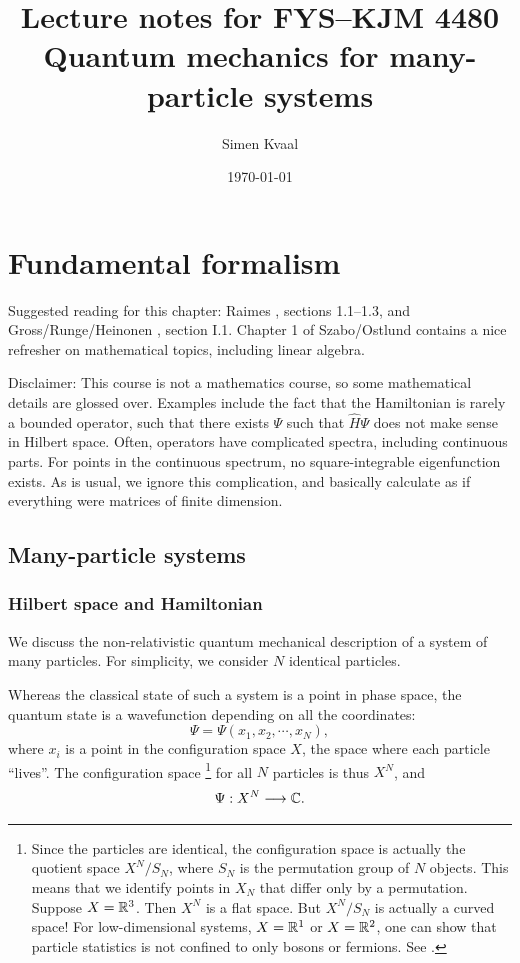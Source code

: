 \documentclass{report}
\title{Lecture notes for FYS--KJM 4480\\\large Quantum mechanics for many-particle systems}
\author{Simen Kvaal}
\date{\today}
\theoremstyle{plain}
\theoremstyle{definition}
\begin{document}
\maketitle

\tableofcontents

\chapter{Fundamental formalism}

Suggested reading for this chapter: Raimes \cite{Raimes}, sections
1.1--1.3, and Gross/Runge/Heinonen \cite{GRH}, section I.1.  Chapter 1
of Szabo/Ostlund \cite{SzaboOstlund} contains a nice refresher on
mathematical topics, including linear algebra.


Disclaimer: This course is not a mathematics course, so some mathematical details
are glossed over. Examples include the fact that the Hamiltonian is
rarely a bounded operator, such that there exists $\Psi$ such that
$\hat{H}\Psi$ does not make sense in Hilbert space. Often, operators
have complicated spectra, including continuous parts. For points in
the continuous spectrum, no square-integrable eigenfunction exists. As is usual, we
ignore this complication, and basically calculate as if everything
were matrices of finite dimension.




\section{Many-particle systems}

\subsection{Hilbert space and Hamiltonian}

We discuss the non-relativistic quantum mechanical description of a
system of many particles. For simplicity, we consider $N$ identical
particles.

Whereas the classical state of such a system is a point in phase
space, the quantum state is a wavefunction depending on all the
coordinates:
\begin{equation}
  \Psi = \Psi(x_1,x_2,\cdots,x_N),
\end{equation}
where $x_i$ is a point in the configuration space $X$, the space where
each particle ``lives''. The
configuration space%
\footnote{Since the particles are identical, the configuration space is
actually the quotient space $X^N/S_N$, where $S_N$ is the permutation
group of $N$ objects. This means that we identify points in $X_N$ that
differ only by a permutation. Suppose $X=\mathbb{R}^3$. Then $X^N$ is a flat
space. But $X^N/S_N$ is actually a curved space! For low-dimensional
systems, $X = \mathbb{R}^1$ or $X = \mathbb{R}^2$, one can show that particle
statistics is not confined to only bosons or fermions. See \cite{Leinaas1977}.}
 for all $N$ particles is thus $X^N$, and
\begin{equation}
  \Psi : X^N \longrightarrow \mathbb{C}.
\end{equation}
\end{document}
